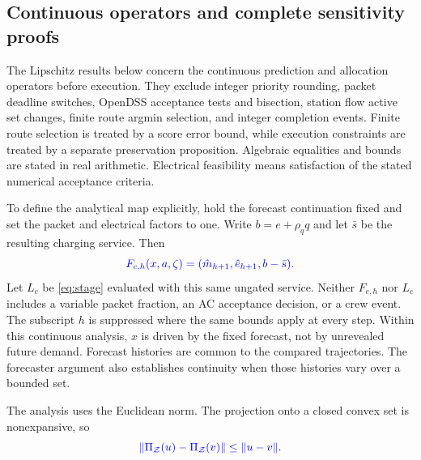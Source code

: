 \documentclass[journal]{IEEEtran}
\providecommand{\DIFadd}[1]{{\protect\color{blue}\uwave{#1}}} %
\renewcommand{\DIFadd}[1]{{\color{blue}#1}}
\begin{document}
\label{app:details}
\setcounter{equation}{0}
\renewcommand{\theequation}{A\arabic{equation}}

\subsection{\DIFadd{Continuous operators and complete sensitivity proofs}}
\label{supp:theory}

\DIFadd{The Lipschitz results below concern the continuous prediction and allocation
operators before execution.  They exclude integer priority rounding, packet deadline switches, OpenDSS
acceptance tests and bisection, station flow active set changes, finite route
argmin selection, and integer completion events.  Finite route selection is
treated by a score error bound, while execution constraints are treated by a
separate preservation proposition.  Algebraic equalities and bounds are stated
in real arithmetic.  Electrical feasibility means satisfaction of the stated
numerical acceptance criteria.
}

\DIFadd{To define the analytical map explicitly, hold the forecast continuation fixed
and set the packet and electrical factors to one.  Write
$b=e+\rho_q q$ and let $\bar s$ be the resulting charging service.  Then
}\begin{equation}
\DIFadd{F_{c,h}(x,a,\zeta)=
(\hat m_{h+1},\hat e_{h+1},b-\bar s).
\label{si:eq:continuous-service}
}\end{equation}
\DIFadd{Let $L_c$ be \eqref{eq:stage} evaluated with this same ungated service.
Neither $F_{c,h}$ nor $L_c$ includes a variable packet fraction, an AC acceptance
decision, or a crew event.  The subscript $h$ is suppressed where the same
bounds apply at every step.  Within this continuous analysis, $x$ is driven by
the fixed forecast, not by unrevealed future demand.  Forecast histories are common to the compared
trajectories.  The forecaster argument also establishes continuity when those
histories vary over a bounded set.
}

\DIFadd{The analysis uses the Euclidean norm.  The projection onto a closed convex set
is nonexpansive, so
}\begin{equation}
\DIFadd{\|\Pi_{\mathcal{Z}}(u)-\Pi_{\mathcal{Z}}(v)\|\le \|u-v\|.
\label{si:eq:projection}
}\end{equation}
\end{document}
